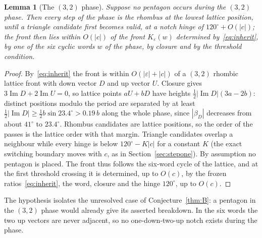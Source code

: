 \documentclass[11pt]{amsart}
\newtheorem{lemma}{Lemma}[section]
\theoremstyle{definition}
\newcommand{\eps}{\varepsilon}
\DeclareMathOperator{\Imag}{Im}
\begin{document}
\begin{lemma}[The $(3,2)$ phase]\label{lem:32phase}
Suppose no pentagon occurs during the $(3,2)$ phase. Then every step of the phase is the rhombus at the
lowest lattice position, until a triangle candidate first becomes valid, at a notch hinge of
$120^\circ+O(|c|)$; the front then lies within
$O(|c|)$ of the front $K_\eps(w)$ determined by~\eqref{eq:inherit}, by one of the six cyclic words $w$ of the
phase, by closure and by the threshold condition.
\end{lemma}

\begin{proof}
By~\eqref{eq:inherit} the front is within $O(|\eps|+|c|)$ of a $(3,2)$ rhombic lattice front with down
vector $D$ and up vector $U$. Closure gives $3\Imag D+2\Imag U=0$, so lattice points $aU+bD$ have heights
$\tfrac12|\Imag D|(3a-2b)$: distinct positions modulo the period are separated by at least
$\tfrac12|\Imag D|\ge\tfrac12 b\sin23.4^\circ>0.19\,b$ along the whole phase, since $|\beta_D|$ decreases from about
$41^\circ$ to $23.4^\circ$. Rhombus candidates are lattice positions, so the order of the passes is the
lattice order with that margin. Triangle candidates overlap a neighbour while every hinge is below
$120^\circ-K|c|$ for a constant $K$ (the exact switching boundary moves with $c$, as in
Section~\ref{sec:stepone}). By assumption no pentagon is placed. The front thus follows the six-word cycle of the
lattice, and at the first threshold crossing it is determined, up to $O(c)$, by the frozen
ratios~\eqref{eq:inherit}, the word, closure and the hinge $120^\circ$, up to $O(c)$.
\end{proof}

The hypothesis isolates the unresolved case of Conjecture~\ref{thm:B}: a pentagon in the
$(3,2)$ phase would already give its asserted breakdown. In the six words the two up vectors are never adjacent, so no one-down-two-up
notch exists during the phase.
\end{document}
